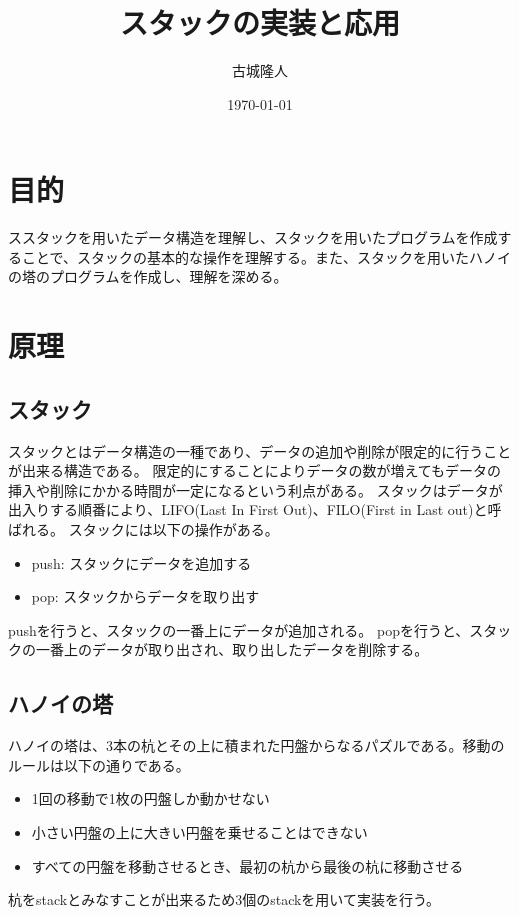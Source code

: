 \documentclass[dvipdfmx]{jsarticle}
\begin{document}
\title{スタックの実装と応用}
\author{古城隆人}
\date{\today}
\maketitle


\newpage


\section{目的}
ススタックを用いたデータ構造を理解し、スタックを用いたプログラムを作成することで、スタックの基本的な操作を理解する。また、スタックを用いたハノイの塔のプログラムを作成し、理解を深める。
\section{原理}
\subsection{スタック}
スタックとはデータ構造の一種であり、データの追加や削除が限定的に行うことが出来る構造である。
限定的にすることによりデータの数が増えてもデータの挿入や削除にかかる時間が一定になるという利点がある。
スタックはデータが出入りする順番により、LIFO(Last In First Out)、FILO(First in Last out)と呼ばれる。
スタックには以下の操作がある。
\begin{itemize}
  \item push: スタックにデータを追加する
  \item pop: スタックからデータを取り出す
\end{itemize}
pushを行うと、スタックの一番上にデータが追加される。
popを行うと、スタックの一番上のデータが取り出され、取り出したデータを削除する。
\subsection{ハノイの塔}\label{sec:mysection}
ハノイの塔は、3本の杭とその上に積まれた円盤からなるパズルである。移動のルールは以下の通りである。
\begin{itemize}
  \item 1回の移動で1枚の円盤しか動かせない
  \item 小さい円盤の上に大きい円盤を乗せることはできない
  \item すべての円盤を移動させるとき、最初の杭から最後の杭に移動させる
\end{itemize}
杭をstackとみなすことが出来るため3個のstackを用いて実装を行う。
\end{document}
